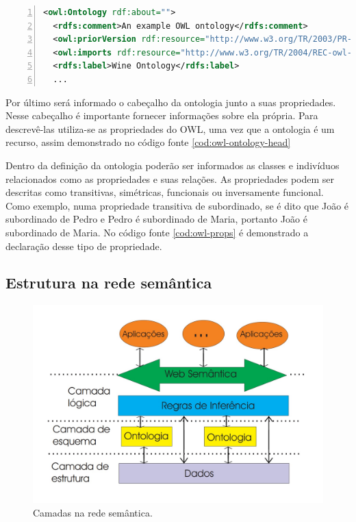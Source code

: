 \begin{lstlisting}[caption=Exemplo do cabeçalho de uma ontologia, language=XML, frame=single, label={cod:owl-ontology-head}, float, numbers=left]
<owl:Ontology rdf:about="">
  <rdfs:comment>An example OWL ontology</rdfs:comment>
  <owl:priorVersion rdf:resource="http://www.w3.org/TR/2003/PR-owl-guide-20031215/wine"/>
  <owl:imports rdf:resource="http://www.w3.org/TR/2004/REC-owl-guide-20040210/food"/>
  <rdfs:label>Wine Ontology</rdfs:label>
  ...
\end{lstlisting}

Por último será informado o cabeçalho da ontologia junto a suas propriedades. Nesse cabeçalho é importante fornecer informações sobre ela própria. Para descrevê-las utiliza-se as propriedades do OWL, uma vez que a ontologia é um recurso, assim demonstrado no código fonte \ref{cod:owl-ontology-head}

Dentro da definição da ontologia poderão ser informados as classes e indivíduos relacionados como as propriedades e suas relações. As propriedades podem ser descritas como transitivas, simétricas, funcionais ou inversamente funcional. Como exemplo, numa propriedade transitiva de subordinado, se é dito que João é subordinado de Pedro e Pedro é subordinado de Maria, portanto João é subordinado de Maria. No código fonte \ref{cod:owl-props} é demonstrado a declaração desse tipo de propriedade.

\subsection{Estrutura na rede semântica}

\begin{figure}
	\centering
	\includegraphics[scale=0.35]{imagens/sw_layers.jpg}
	\caption{Camadas na rede semântica. \citep{OWLReport:2005}}
	\label{fig:sw-layers}
\end{figure}

